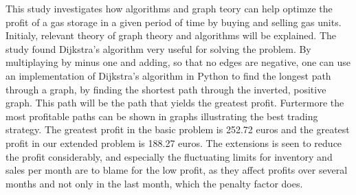 This study investigates how algorithms and graph teory can help optimze the profit of a gas storage in a given period of time by buying and selling gas units.
Initialy, relevant theory of graph theory and algorithms will be explained. The study found Dijkstra's algorithm very useful for solving the problem. By multiplaying by minus one and adding, so that no edges are negative, one can use an implementation of Dijkstra's algorithm in Python to find the longest path through a graph, by finding the shortest path through the inverted, positive graph. This path will be the path that yields the greatest profit. Furtermore the most profitable paths can be shown in graphs illustrating the best trading strategy. The greatest profit in the basic problem is 252.72 euros and the greatest profit in our extended problem is 188.27 euros. 
The extensions is seen to reduce the profit considerably, and  especially the fluctuating limits for inventory and sales per month are to blame for the low profit, as they affect profits over several months and not only in the last month, which the penalty factor does. 
